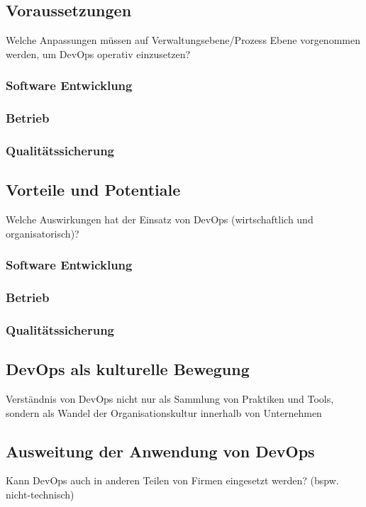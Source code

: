 \subsection{Voraussetzungen}
Welche Anpassungen müssen auf Verwaltungsebene/Prozess Ebene vorgenommen werden, um DevOps operativ einzusetzen?

\subsubsection{Software Entwicklung}

\subsubsection{Betrieb}

\subsubsection{Qualitätssicherung}

\subsection{Vorteile und Potentiale}
Welche Auswirkungen hat der Einsatz von DevOps (wirtschaftlich und organisatorisch)?

\subsubsection{Software Entwicklung}

\subsubsection{Betrieb}

\subsubsection{Qualitätssicherung}

\subsection{DevOps als kulturelle Bewegung}
Verständnis von DevOps nicht nur als Sammlung von Praktiken und Tools, sondern als Wandel
der Organisationskultur innerhalb von Unternehmen

\subsection{Ausweitung der Anwendung von DevOps}
Kann DevOps auch in anderen Teilen von Firmen eingesetzt werden? (bspw. nicht-technisch)


